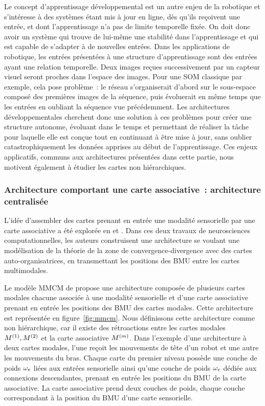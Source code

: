 \documentclass[../main]{subfiles}
\begin{document}
Le concept d'apprentissage  développemental est un autre enjeu de la robotique et s'intéresse à des systèmes étant mis à jour en ligne, dès qu'ils reçoivent une entrée, et dont l'apprentissage n'a pas de limite temporelle fixée. On doit donc avoir un système qui trouve de lui-même une stabilité dans l'apprentissage et qui est capable de s'adapter à de nouvelles entrées.
Dans les applications de robotique, les entrées présentées à une structure d'apprentissage sont des entrées ayant une relation temporelle. Deux images reçues successivement par un capteur visuel seront proches dans l'espace des images. Pour une SOM classique par exemple, cela pose problème~: le réseau s'organiserait d'abord sur le sous-espace composé des premières images de la séquence, puis évoluerait en même temps que les entrées en oubliant la séquence vue précédemment.
Les architectures développementales cherchent donc une solution à ces problèmes pour créer une structure autonome, évoluant dans le temps et permettant de réaliser la tâche pour laquelle elle est conçue tout en continuant à être mise à jour, sans oublier catastrophiquement les données apprises au début de l'apprentissage.
Ces enjeux applicatifs, communs aux architectures présentées dans cette partie, nous motivent également à étudier les cartes non hiérarchiques.

\subsubsection{Architecture comportant une carte associative~: architecture centralisée}

L'idée d'assembler des cartes prenant en entrée une modalité sensorielle par une carte associative a été explorée en \cite{dominey13} et \cite{escobar-juarez_self-organized_2016}.
Dans ces deux travaux de neurosciences computationnelles, les auteurs construisent une architecture se voulant une modélisation de la théorie de la zone de convergence-divergence \parencite{Edelman1982GroupSA} avec des cartes auto-organisatrices, en transmettant les positions des BMU entre les cartes multimodales. 

Le modèle MMCM de \cite{dominey13} propose une architecture composée de plusieurs cartes modales chacune associée à une modalité sensorielle et d'une carte associative prenant en entrée les positions des BMU des cartes modales. Cette architecture est représentée en figure~\ref{fig:mmcm}. 
Nous définissons cette architecture comme non hiérarchique, car il existe des rétroactions entre les cartes modales $M^{({1})},M^{({2})}$ et la carte associative $M^{({m})}$.
Dans l'exemple d'une architecture à deux cartes modales, l'une reçoit les mouvements de tête d'un robot et une autre les mouvements du bras.
Chaque carte du premier niveau possède une couche de poids $\omega_e$ liées aux entrées sensorielle ainsi qu'une couche de poids $ \omega_c$ dédiée aux connexions descendantes, prenant en entrée les positions du BMU de la carte associative.
La carte associative prend deux couches de poids, chaque couche correspondant à la position du BMU d'une carte sensorielle.
\end{document}
